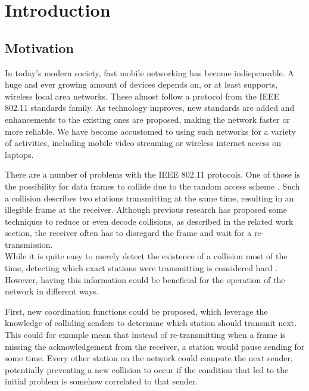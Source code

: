 \chapter{Introduction}\label{ch:introduction}
\glsresetall %



\section{Motivation}

In today's modern society, fast mobile networking has become indispensable. A huge and ever growing amount of devices depends on, or at least supports, wireless local area networks. These almost follow a protocol from the IEEE 802.11 standards family. As technology improves, new standards are added and enhancements to the existing ones are proposed, making the network faster or more reliable. We have become accustomed to using such networks for a variety of activities, including mobile video streaming or wireless internet access on laptops.

There are a number of problems with the IEEE 802.11 protocols. One of those is the possibility for data frames to collide due to the random access scheme \cite{NEEDED}. Such a collision describes two stations transmitting at the same time, resulting in an illegible frame at the receiver. Although previous research has proposed some techniques to reduce or even decode collisions, as described in the related work section, the receiver often has to disregard the frame and wait for a re-transmission.\\

While it is quite easy to merely detect the existence of a collision most of the time, detecting which exact stations were transmitting is considered hard \cite{NEEDED}. However, having this information could be beneficial for the operation of the network in different ways.

First, new coordination functions could be proposed, which leverage the knowledge of colliding senders to determine which station should transmit next. This could for example mean that instead of re-transmitting when a frame is missing the acknowledgement from the receiver, a station would pause sending for some time. Every other station on the network could compute the next sender, potentially preventing a new collision to occur if the condition that led to the initial problem is somehow correlated to that sender.

